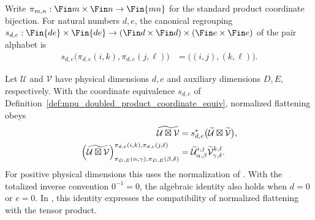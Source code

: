 \begin{definition}
    \label{def:mpu_doubled_product_coordinate_equiv}
    \leanok
    Write
    $\pi_{m,n}:\Fin m\times\Fin n\to\Fin{mn}$ for the standard product
    coordinate bijection.  For natural numbers $d,e$, the canonical regrouping
    $s_{d,e}:\Fin{de}\times\Fin{de}\to(\Fin d\times\Fin d)\times(\Fin e\times\Fin e)$
    of the pair alphabet is
    \begin{align}
        s_{d,e}\bigl(\pi_{d,e}(i,k),\pi_{d,e}(j,\ell)\bigr)
         & =\bigl((i,j),(k,\ell)\bigr).
        \label{eq:mpu_tensor_flattening_shuffle}
    \end{align}
\end{definition}

\begin{lemma}
    \label{thm:mpu_normalized_flattening_tensor_product}
    \leanok
    Let $\mathcal U$ and $\mathcal V$ have physical dimensions $d,e$ and
    auxiliary dimensions $D,E$, respectively.  With the coordinate
    equivalence $s_{d,e}$ of
    Definition~\ref{def:mpu_doubled_product_coordinate_equiv}, normalized
    flattening obeys
    \begin{align}
        \widetilde{\mathcal U\boxtimes\mathcal V}
         & =s_{d,e}^{*}
        \bigl(\widetilde{\mathcal U}\boxtimes
        \widetilde{\mathcal V}\bigr), \notag            \\
        \left(\widetilde{\mathcal U\boxtimes\mathcal V}\right)^{
                \pi_{d,e}(i,k),\pi_{d,e}(j,\ell)}_{
                \pi_{D,E}(\alpha,\gamma),\pi_{D,E}(\beta,\delta)}
         & =\widetilde{\mathcal U}^{i,j}_{\alpha,\beta}
        \widetilde{\mathcal V}^{k,\ell}_{\gamma,\delta}.
        \label{eq:mpu_tensor_normalized_flattening}
    \end{align}
    For positive physical dimensions this uses the normalization of
    \cite[Section~III, equation~(13)]{Cirac2017MPU}.  With the totalized
    inverse convention $0^{-1}=0$, the algebraic identity also holds when
    $d=0$ or $e=0$.  In \cite[Theorem~IV.6(ii), lines~824--845]{Cirac2017MPU}, this identity expresses the compatibility of normalized flattening with the
    tensor product.
\end{lemma}

